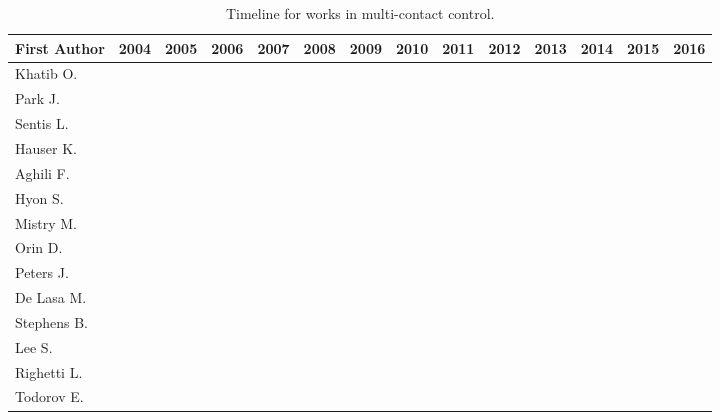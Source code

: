 \begin{table*}[t]
	\caption{Timeline for works in multi-contact control.}
	\label{tab:Timeline}
	\tiny
	\centering
	\begin{tabular}{|l|c|c|c|c|c|c|c|c|c|c|c|c|c|}
		\hline
		First Author	&
		2004	& 2005	& 2006	& 2007	& 2008	& 2009	& 2010	& 2011	& 2012	& 2013	& 2014	& 2015	& 2016	\\
		\hline
		Khatib O.			&
		\cite{Khatib_IJHR2004}	& & & & & & & & & & & & \\
		Park J.				&
		\cite{Park_ICRA2004}		& \cite{Park_ICRA2005}	& \cite{Park_ICRA2006} \cite{Park_PhDThesis2006}
		&	&	\cite{Park_Robotica2008}	& & & & & & & & \\
		Sentis L.			&
		\cite{Sentis_IJHR2004} & \cite{Sentis_ICRA2005} \cite{Sentis_IJHR2005}	& \cite{Sentis_ICRA2006}
		& \cite{Sentis_PhDThesis2007}	& & \cite{Sentis_IROS2009}
		& \cite{Sentis_MotionPlan2010} \cite{Sentis_TransRobotics2010}	&	& & & & & \\
		Hauser K.			&
		& \cite{Hauser_Humanoids2005} & & & & & & & & & & & \\
		Aghili F.			&
		& \cite{Aghili_TransRobotics2005} & & & & & & & & & & & \cite{Aghili_ICRA2016} \\
		Hyon S.				&
		& & \cite{Hyon_Humanoids2006} \cite{Hyon_IROS2006}	& \cite{Hyon_ICRA2007} \cite{Hyon_TransRobotics2007}
		& & \cite{Hyon_ICRA2009} \cite{Hyon_TransRobotics2009}	& & & & & & & \\
		Mistry M.			&
		& & & \cite{Mistry_IROS2007} & & & \cite{Mistry_ICRA2010}	& \cite{Mistry_RSS2011}	& & & & & \\
		Orin D.				&
		& & & & \cite{Orin_IROS2008} & & & & & \cite{Orin_AutoRobots2013} & & & \\
		Peters J.			&
		& & & & \cite{Peters_AutoRobots2008} & & & & & & & & \\
		De Lasa M.		&
		& & & & & \cite{DeLasa_IROS2009}	& & & & & & & \\
		Stephens B.		&
		& & & & & & \cite{Stephens_IROS2010}	& \cite{Stephens_PhDThesis2011}	& & & & & \\
		Lee S.				&
		& & & & & & \cite{LeeS_IROS2010}	& & \cite{LeeS_AutoRobots2012}	& & & & \\
		Righetti L.		&
		& & & & & & \cite{Righetti_CLAWAR2010} & \cite{Righetti_ICRA2011} \cite{Righetti_Humanoids2011}
		& \cite{Righetti_Humanoids2012}	& \cite{Righetti_IJRR2013}	& & & \\
		Todorov E.		&
		& & & & & & \cite{Todorov_ICRA2010}	& \cite{Todorov_ICRA2011} & \cite{Todorov_IROS2012}	& & & & \\

\end{tabular}
\end{table*}
